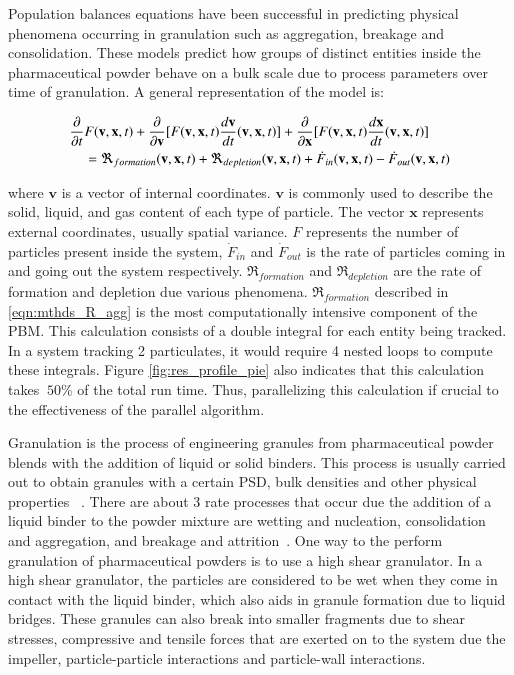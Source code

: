 \documentclass[preprint,10pt,authoryear,review]{elsarticle}
\begin{document}
Population balances equations have been successful in 
predicting physical phenomena occurring in granulation such as aggregation, breakage and 
consolidation. These models predict how groups of distinct entities inside the pharmaceutical 
powder behave on a bulk scale due to process parameters over time of granulation. A
general representation of the model is:

\begin{align}
\frac{ \partial}{\partial t}&F(\textbf{v},\textbf{x},t) + \frac{\partial}{\partial 
\textbf{v}}[F(\textbf{v},\textbf{x},t)\frac{d\textbf{v}}{dt}(\textbf{v},\textbf{x},t)] 
+ \frac{\partial}{\partial \textbf{x}}[F(\textbf{v},\textbf{x},t)\frac{d\textbf{x}}{dt}
(\textbf{v},\textbf{x},t)] \notag\\
    &= 
\Re_{formation}(\textbf{v},\textbf{x},t)+\Re_{depletion}(\textbf{v},\textbf{x},t)
+\dot{F}_{in}(\textbf{v},\textbf{x},t) -\dot{F}_{out}(\textbf{v},\textbf{x},t) 
\label{eqn:bkgd_pbm_general} 
\end{align}

where $\textbf{v}$ is a vector of internal 
coordinates.  $\textbf{v}$ is commonly used to describe the solid, liquid, 
and gas content of each type of particle. The vector $\textbf{x}$ represents 
external coordinates, usually spatial variance. $F$ represents the 
number of particles present inside the system, $\dot{F}_{in}$ 
and $\dot{F}_{out}$ is the rate of particles coming in and going out the 
system respectively. $\Re_{formation}$ and $\Re_{depletion}$ are the rate of 
formation and depletion due various phenomena. $\Re_{formation}$ described in 
\ref{eqn:mthds_R_agg} is the most computationally intensive component of the PBM.
This calculation consists of a double integral for each entity being tracked. In a 
system tracking 2 particulates, it would require 4 nested loops to compute these 
integrals. Figure \ref{fig:res_profile_pie} also indicates that this calculation 
takes $~50\%$ of the total run time. Thus, parallelizing this calculation if crucial 
to the effectiveness of the parallel algorithm.

Granulation is the process of engineering granules from pharmaceutical powder blends 
with the addition of liquid or solid binders. This process is usually carried out 
to obtain granules with a certain PSD,  bulk densities and other physical properties
~\citep{Barrasso2015cerd}. There are about 3 rate processes that occur due the addition 
of a liquid binder to the powder mixture are wetting and nucleation, consolidation and 
aggregation, and breakage and attrition~\citep{sen2014}. One way to the perform 
granulation of pharmaceutical powders is to use a high shear granulator. 
In a high shear granulator, the particles are considered to be wet 
when they come in contact with the liquid binder, which also aids in granule formation due to 
liquid bridges. These granules can also break into smaller fragments due to shear stresses, 
compressive and tensile forces that are exerted on to the system due the impeller, 
particle-particle interactions and particle-wall interactions.
\end{document}
